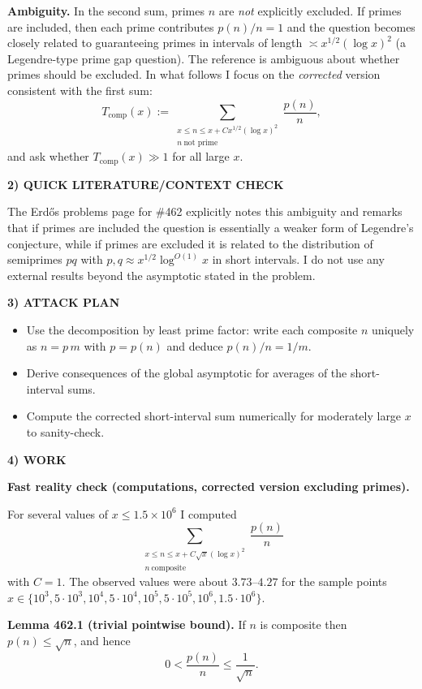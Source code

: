 \textbf{Ambiguity.} In the second sum, primes $n$ are \emph{not} explicitly excluded. If primes are included, then each prime contributes $p(n)/n=1$ and the question becomes closely related to guaranteeing primes in intervals of length $\asymp x^{1/2}(\log x)^2$ (a Legendre-type prime gap question).  The reference is ambiguous about whether primes should be excluded.  In what follows I focus on the \emph{corrected} version consistent with the first sum:
\[T_{\mathrm{comp}}(x):=\sum_{\substack{x\le n\le x+C x^{1/2}(\log x)^2\\ n\ \textrm{not prime}}}\frac{p(n)}{n},\]
and ask whether $T_{\mathrm{comp}}(x)\gg 1$ for all large $x$.

\noindent\textbf{2) QUICK LITERATURE/CONTEXT CHECK}

The Erd\H{o}s problems page for \#462 explicitly notes this ambiguity and remarks that if primes are included the question is essentially a weaker form of Legendre's conjecture, while if primes are excluded it is related to the distribution of semiprimes $pq$ with $p,q\approx x^{1/2}\log^{O(1)}x$ in short intervals. I do not use any external results beyond the asymptotic stated in the problem.

\noindent\textbf{3) ATTACK PLAN}

\begin{itemize}
\item Use the decomposition by least prime factor: write each composite $n$ uniquely as $n=p\,m$ with $p=p(n)$ and deduce $p(n)/n=1/m$.
\item Derive consequences of the global asymptotic for averages of the short-interval sums.
\item Compute the corrected short-interval sum numerically for moderately large $x$ to sanity-check.
\end{itemize}

\noindent\textbf{4) WORK}

\textbf{Fast reality check (computations, corrected version excluding primes).}

For several values of $x\le 1.5\times 10^6$ I computed
\[\sum_{\substack{x\le n\le x+ C\sqrt{x}(\log x)^2\\ n\ \mathrm{composite}}}\frac{p(n)}{n}
\]
with $C=1$.  The observed values were about $3.73$--$4.27$ for the sample points $x\in\{10^3,5\cdot 10^3,10^4,5\cdot 10^4,10^5,5\cdot 10^5,10^6,1.5\cdot 10^6\}$.

\medskip
\noindent\textbf{Lemma 462.1 (trivial pointwise bound).}
If $n$ is composite then $p(n)\le \sqrt{n}$, and hence
\[0<\frac{p(n)}{n}\le \frac1{\sqrt{n}}.
\]

